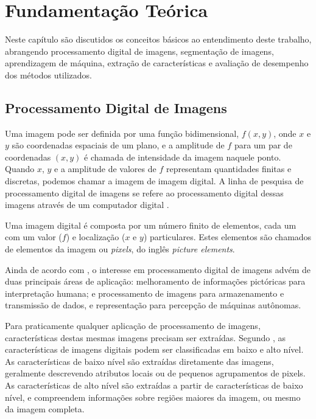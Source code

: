 \chapter{Fundamentação Teórica}\label{cap:fundamentacao}

Neste capítulo são discutidos os conceitos básicos ao entendimento deste trabalho, abrangendo processamento digital de imagens, segmentação de imagens, aprendizagem de máquina, extração de características e avaliação de desempenho dos métodos utilizados.

\section{Processamento Digital de Imagens}

Uma imagem pode ser definida por uma função bidimensional, $f(x,y)$, onde $x$ e $y$ são coordenadas espaciais de um plano, e a amplitude de $f$ para um par de coordenadas $(x,y)$ é chamada de intensidade da imagem naquele ponto. Quando $x$, $y$ e a amplitude de valores de $f$ representam quantidades finitas e discretas, podemos chamar a imagem de imagem  digital. A linha de pesquisa de processamento digital de imagens se refere ao processamento digital dessas imagens através de um computador digital \cite{gonzalez:2002}.

Uma imagem digital é composta por um número finito de elementos, cada um com um valor ($f$) e localização ($x$ e $y$) particulares. Estes elementos são chamados de elementos da imagem ou \textit{pixels}, do inglês \textit{picture elements}.

Ainda de acordo com , o interesse em processamento digital de imagens advém de duas principais áreas de aplicação: melhoramento de informações pictóricas para interpretação humana; e processamento de imagens para armazenamento e transmissão de dados, e representação para percepção de máquinas autônomas.

Para praticamente qualquer aplicação de processamento de imagens, características destas mesmas imagens precisam ser extraídas. Segundo , as características de imagens digitais podem ser classificadas em baixo e alto nível. As características de baixo nível são extraídas diretamente das imagens, geralmente descrevendo atributos locais ou de pequenos agrupamentos de pixels. As características de alto nível são extraídas a partir de características de baixo nível, e compreendem informações sobre regiões maiores da imagem, ou mesmo da imagem completa.

